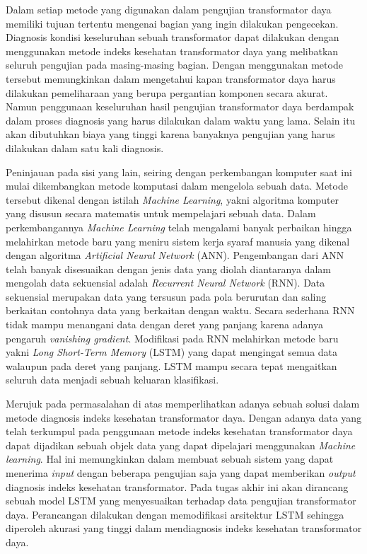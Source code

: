 Dalam setiap metode yang digunakan dalam pengujian transformator daya memiliki tujuan tertentu mengenai bagian yang ingin dilakukan pengecekan. Diagnosis kondisi keseluruhan sebuah transformator dapat dilakukan dengan menggunakan metode indeks kesehatan transformator daya yang melibatkan seluruh pengujian pada masing-masing bagian\cite{jahromi2009approach}. Dengan menggunakan metode tersebut memungkinkan dalam mengetahui kapan transformator daya harus dilakukan pemeliharaan yang berupa pergantian komponen secara akurat. Namun penggunaan keseluruhan hasil pengujian transformator daya berdampak dalam proses diagnosis yang harus dilakukan dalam waktu yang lama. Selain itu akan dibutuhkan biaya yang tinggi karena banyaknya pengujian yang harus dilakukan dalam satu kali diagnosis. 

Peninjauan pada sisi yang lain, seiring dengan perkembangan komputer saat ini mulai dikembangkan metode komputasi dalam mengelola sebuah data. Metode tersebut dikenal dengan istilah \textit{Machine Learning}, yakni algoritma komputer yang disusun secara matematis untuk mempelajari sebuah data. Dalam perkembangannya \textit{Machine Learning} telah mengalami banyak perbaikan hingga melahirkan metode baru yang meniru sistem kerja syaraf manusia yang dikenal dengan algoritma \textit{Artificial Neural Network} (ANN). Pengembangan dari ANN telah banyak disesuaikan dengan jenis data yang diolah diantaranya dalam mengolah data sekuensial adalah \textit{Recurrent Neural Network} (RNN). Data sekuensial merupakan data yang tersusun pada pola berurutan dan saling berkaitan contohnya data yang berkaitan dengan waktu. Secara sederhana RNN tidak mampu menangani data dengan deret yang panjang karena adanya pengaruh \textit{vanishing gradient}. Modifikasi pada RNN melahirkan metode baru yakni \textit{Long Short-Term Memory} (LSTM) yang dapat mengingat semua data walaupun pada deret yang panjang. LSTM mampu secara tepat mengaitkan seluruh data menjadi sebuah keluaran klasifikasi. \par 

Merujuk pada permasalahan di atas memperlihatkan adanya sebuah solusi dalam metode diagnosis indeks kesehatan transformator daya. Dengan adanya data yang telah terkumpul pada penggunaan metode indeks kesehatan transformator daya dapat dijadikan sebuah objek data yang dapat dipelajari menggunakan \textit{Machine learning}. Hal ini memungkinkan dalam membuat sebuah sistem yang dapat menerima \textit{input} dengan beberapa pengujian saja yang dapat memberikan \textit{output} diagnosis indeks kesehatan transformator. Pada tugas akhir ini akan dirancang sebuah model LSTM yang menyesuaikan terhadap data pengujian transformator daya. Perancangan dilakukan dengan memodifikasi arsitektur LSTM sehingga diperoleh akurasi yang tinggi dalam mendiagnosis indeks kesehatan transformator daya.


